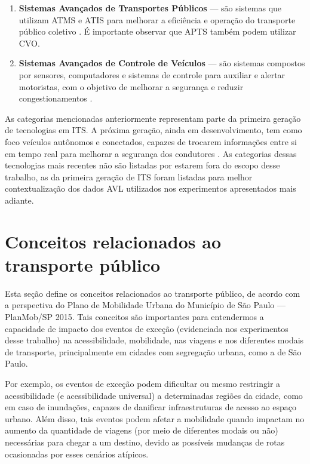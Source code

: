 \documentclass[
	12pt,				%
	oneside,			%
	a4paper,			%
	english,			%
	brazil				%
	]{abntex2ppgsi}
\begin{document}
{\begin{enumerate}
\begin{enumerate}
\end{enumerate}
\item \textbf{Sistemas Avançados de Transportes Públicos}  --- são sistemas que utilizam ATMS e ATIS para melhorar a eficiência e operação do transporte público coletivo \cite{figueiredo2001towards}. É importante observar que APTS também podem utilizar CVO.
\item \textbf{Sistemas Avançados de Controle de Veículos}  --- são sistemas compostos por sensores, computadores e sistemas de controle para auxiliar e alertar motoristas, com o objetivo de melhorar a segurança e reduzir congestionamentos \cite{figueiredo2001towards}.
\end{enumerate}

As categorias mencionadas anteriormente representam parte da primeira geração de tecnologias em ITS. A próxima geração, ainda em desenvolvimento, tem como foco veículos autônomos e conectados, capazes de trocarem informações entre si em tempo real para melhorar a segurança dos condutores \cite{menouar2017uav}. As categorias dessas tecnologias mais recentes não são listadas por estarem fora do escopo desse trabalho, as da primeira geração de ITS foram listadas para melhor contextualização dos dados AVL utilizados nos experimentos apresentados mais adiante. 

\section{Conceitos relacionados ao transporte público}
\label{mobility}

Esta seção define os conceitos relacionados ao transporte público, de acordo com a perspectiva do Plano de Mobilidade Urbana do Município de São Paulo --- PlanMob/SP 2015. Tais conceitos são importantes para entendermos a capacidade de impacto dos eventos de exceção (evidenciada nos experimentos desse trabalho) na acessibilidade, mobilidade, nas viagens e nos diferentes modais de transporte, principalmente em cidades com segregação urbana, como a de São Paulo. 

Por exemplo, os eventos de exceção podem dificultar ou mesmo restringir a acessibilidade (e acessibilidade universal) a determinadas regiões da cidade, como em caso de inundações, capazes de danificar infraestruturas de acesso ao espaço urbano.  Além disso, tais eventos podem afetar a mobilidade quando impactam no aumento da quantidade de viagens (por meio de diferentes modais ou não) necessárias para chegar a um destino, devido as possíveis mudanças de rotas ocasionadas por esses cenários atípicos.  

}
\end{document}
